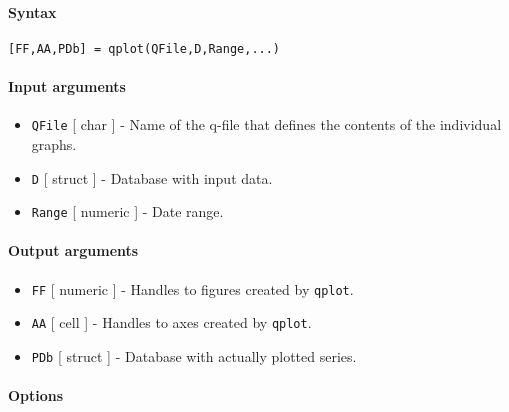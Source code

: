 


	\paragraph{Syntax}\label{syntax}

\begin{verbatim}
[FF,AA,PDb] = qplot(QFile,D,Range,...)
\end{verbatim}

\paragraph{Input arguments}\label{input-arguments}

\begin{itemize}
\item
  \texttt{QFile} {[} char {]} - Name of the q-file that defines the
  contents of the individual graphs.
\item
  \texttt{D} {[} struct {]} - Database with input data.
\item
  \texttt{Range} {[} numeric {]} - Date range.
\end{itemize}

\paragraph{Output arguments}\label{output-arguments}

\begin{itemize}
\item
  \texttt{FF} {[} numeric {]} - Handles to figures created by
  \texttt{qplot}.
\item
  \texttt{AA} {[} cell {]} - Handles to axes created by \texttt{qplot}.
\item
  \texttt{PDb} {[} struct {]} - Database with actually plotted series.
\end{itemize}

\paragraph{Options}\label{options}

